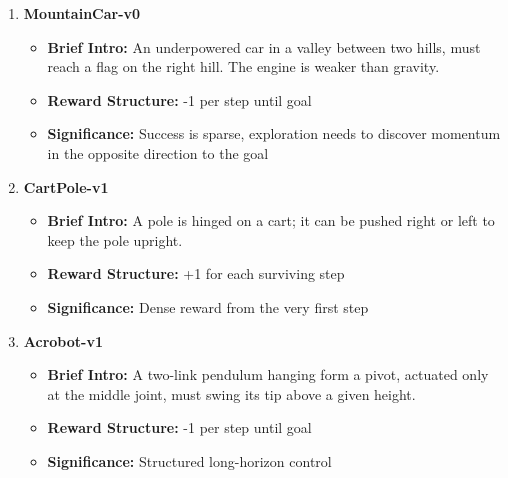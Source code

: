 \documentclass[preprint,12pt]{elsarticle}
\begin{document}
\begin{enumerate}[leftmargin=*, itemsep=0.8em]

    \item
    \begin{minipage}[t]{\linewidth}
    \textbf{MountainCar-v0}
    \begin{itemize}[leftmargin=1.5em, itemsep=0.2em, topsep=0.2em]
        \item \textbf{Brief Intro:} An underpowered car in a valley between two hills, must reach a flag on the right hill. The engine is weaker than gravity.
        \item \textbf{Reward Structure:} -1 per step until goal
        \item \textbf{Significance:} Success is sparse, exploration needs to discover momentum in the opposite direction to the goal
    \end{itemize}
    \end{minipage}

    \item
    \begin{minipage}[t]{\linewidth}
    \textbf{CartPole-v1}
    \begin{itemize}[leftmargin=1.5em, itemsep=0.2em, topsep=0.2em]
        \item \textbf{Brief Intro:} A pole is hinged on a cart; it can be pushed right or left to keep the pole upright.
        \item \textbf{Reward Structure:} +1 for each surviving step
        \item \textbf{Significance:} Dense reward from the very first step
    \end{itemize}
    \end{minipage}

    \item
    \begin{minipage}[t]{\linewidth}
    \textbf{Acrobot-v1}
    \begin{itemize}[leftmargin=1.5em, itemsep=0.2em, topsep=0.2em]
        \item \textbf{Brief Intro:} A two-link pendulum hanging form a pivot, actuated only at the middle joint, must swing its tip above a given height.
        \item \textbf{Reward Structure:} -1 per step until goal
        \item \textbf{Significance:} Structured long-horizon control
    \end{itemize}
    \end{minipage}


\end{enumerate}
\end{document}
